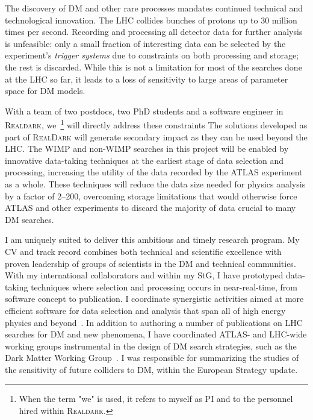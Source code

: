 \documentclass[11pt,a4paper]{article}
\begin{document}
The discovery of DM and other rare processes mandates continued technical and technological innovation. The LHC collides bunches of protons up to 30 million times per second. 
Recording and processing all detector data for further analysis is unfeasible: only a small fraction of interesting data can be selected by the experiment’s \textit{trigger systems} due to constraints on both processing and storage; the rest is discarded.
While this is not a limitation for most of the searches done at the LHC so far,
it leads to a loss of sensitivity to large areas of parameter space for DM models. 

With a team of two postdocs, two PhD students and a software engineer in \textsc{Realdark}, we~\footnote{When the term "we" is used, it refers to myself as PI and to the personnel hired within \textsc{Realdark}.} will directly address these constraints
The solutions developed as part of \textsc{RealDark} will generate secondary impact as they can be used beyond the LHC. %
The WIMP and non-WIMP searches in this project will be enabled by innovative data-taking techniques at the earliest stage of data selection and processing, increasing the utility of the data recorded by the ATLAS experiment as a whole. 
These techniques will reduce the data size needed for physics analysis by a factor of 2--200, %
overcoming storage limitations that would otherwise force ATLAS and other experiments to discard the majority of data crucial to many DM searches.

I am uniquely suited to deliver this ambitious and timely research program. 
My CV and track record combines both technical and scientific excellence with proven leadership of groups of scientists in the DM and technical communities. 
With my international collaborators and within my StG, I have prototyped data-taking techniques where selection and processing occurs in near-real-time, from software concept to publication. %
I coordinate synergistic activities aimed at more efficient software for data selection and analysis that span all of high energy physics and beyond~\cite{Alves:2017she}. 
In addition to authoring a number of publications on LHC searches for DM and new phenomena,
I have coordinated ATLAS- and LHC-wide working groups instrumental in the design of DM search strategies, such as the Dark Matter Working Group~\cite{DMWGWebsite}. 
I was responsible for summarizing the studies of the sensitivity of future colliders to DM, within the European Strategy update. 
\end{document}
